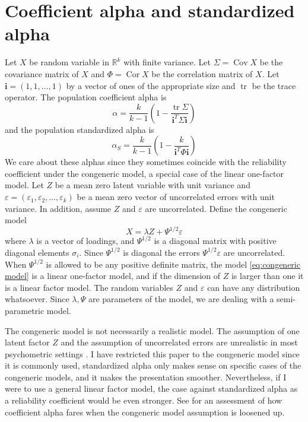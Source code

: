 \documentclass[twoside]{article}
\DeclareMathOperator{\tr}{tr}
\DeclareMathOperator{\Cor}{Cor}
\DeclareMathOperator{\Cov}{Cov}
\begin{document}
\section{Coefficient alpha and standardized alpha}
\label{sec:coefficienta alpha}

Let $X$ be random variable in $\mathbb{R}^{k}$ with finite variance.
Let $\Sigma=\Cov X$ be the covariance matrix of $X$ and $\Phi=\Cor X$
be the correlation matrix of $X$. Let $\mathbf{i}=(1,1,\ldots,1)$ by a vector of ones of the appropriate size and $\tr$ be the trace operator.
The population coefficient alpha \citep[][eq. 2]{cronbach1951coefficient} is
\begin{equation}
\alpha =  \frac{k}{k-1}\left(1-\frac{\tr\Sigma}{\mathbf{i}^{T}\Sigma\mathbf{i}}\right)\label{eq:Coefficient alpha}
\end{equation}
and the population standardized alpha \citep[][eq. 2]{Falk2011-ae} is
\begin{equation}
\alpha_S=\frac{k}{k-1}\left(1-\frac{k}{\mathbf{i}^{T}\Phi\mathbf{i}}\right)\label{eq:standardized alpha}
\end{equation}
We care about these alphas since they sometimes coincide with the reliability coefficient under the congeneric model, a special case of the linear one-factor model. Let $Z$ be a mean zero latent variable with unit variance and $\varepsilon=(\varepsilon_{1},\varepsilon_{2},\ldots,\varepsilon_{k})$
be a mean zero vector of uncorrelated errors with unit variance. In addition, assume $Z$ and $\varepsilon$ are uncorrelated. Define the congeneric model
\begin{equation}
X=\lambda Z+\Psi^{1/2}\varepsilon\label{eq:congeneric model}
\end{equation}
where $\lambda$ is a vector of loadings, and $\Psi^{1/2}$ is a diagonal matrix with positive diagonal elements $\sigma_i$. Since $\Psi^{1/2}$ is diagonal the errors $\Psi^{1/2}\varepsilon$ are uncorrelated. When $\Psi^{1/2}$ is allowed to be any positive definite matrix, the model \eqref{eq:congeneric model} is a linear one-factor model, and if the dimension of $Z$ is larger than one it is a linear factor model. The random variables $Z$ and $\varepsilon$ can have any distribution whatsoever. Since $\lambda,\Psi$ are parameters of the model, we are dealing with a semi-parametric model. 

The congeneric model is not necessarily a realistic model. The assumption of one latent factor $Z$ and the assumption of uncorrelated errors are unrealistic in most psychometric settings \citep[][section 1.2 -- 1.3]{Green2009-le}. I have restricted this paper to the congeneric model since it is commonly used, standardized alpha only makes sense on specific cases of the congeneric models, and it makes the presentation smoother. Nevertheless, if I were to use a general linear factor model, the case against standardized alpha as a reliability coefficient would be even stronger. See \citet[][section 2]{Green2009-le} for an assessment of how coefficient alpha fares when the congeneric model assumption is loosened up.
\end{document}
